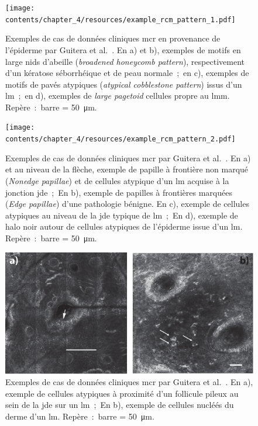 \begin{figure}[p]
    \begin{center}
        \texttt{[image: contents/chapter\_4/resources/example\_rcm\_pattern\_1.pdf]}
        \caption{Exemples de cas de données cliniques \gls{mcr} en provenance de l'épiderme par Guitera et al.~\cite{Guitera2010}. En a) et b), exemples de motifs en large nids d'abeille (\textit{broadened honeycomb pattern}), respectivement d'un kératose séborrhéique et de peau normale~;~en c), exemples de motifs de pavés atypiques (\textit{atypical cobblestone pattern}) issus d'un \gls{lm}~;~en d), exemples de \textit{large pagetoid} cellules propre au \gls{lmm}. Repère~:~barre = \SI{50}{\micro\metre}.}
        \label{fig:example_rcm_pattern_1}
    \end{center} 
\end{figure}\par

\begin{figure}[p]
    \begin{center}
        \texttt{[image: contents/chapter\_4/resources/example\_rcm\_pattern\_2.pdf]}
        \caption{Exemples de cas de données cliniques \gls{mcr} par Guitera et al.~\cite{Guitera2010}. En a) et au niveau de la flèche, exemple de papille à frontière non marqué (\textit{Nonedge papillae}) et de cellules atypique d'un \gls{lm} acquise à la jonction \gls{jde}~;~En b), exemple de papilles à frontières marquées (\textit{Edge papillae}) d'une pathologie bénigne. En c), exemple de cellules atypiques au niveau de la \gls{jde} typique de \gls{lm}~;~En d), exemple de halo noir autour de cellules atypiques de l'épiderme issue d'un \gls{lm}. Repère~:~barre = \SI{50}{\micro\metre}.}
        \label{fig:example_rcm_pattern_2}
    \end{center} 
\end{figure}\par

\begin{figure}[H]
    \begin{center}
        \includegraphics[width=\linewidth]{contents/chapter_4/resources/example_rcm_pattern_3.pdf}
        \caption{Exemples de cas de données cliniques \gls{mcr} par Guitera et al.~\cite{Guitera2010}. En a), exemple de cellules atypiques à proximité d'un follicule pileux au sein de la \gls{jde} sur un \gls{lm}~;~En b), exemple de cellules nucléés du derme d'un \gls{lm}. Repère~:~barre = \SI{50}{\micro\metre}.}
        \label{fig:example_rcm_pattern_3}
    \end{center} 
\end{figure}\par

